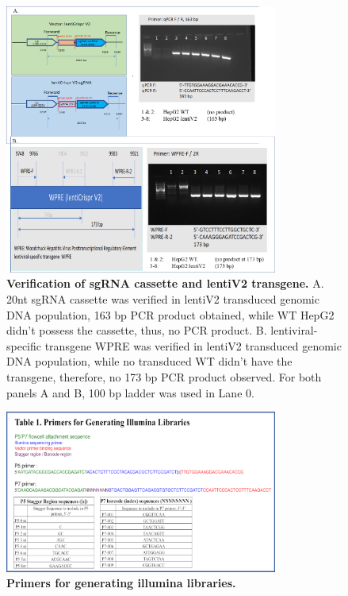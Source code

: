 \documentclass[
  a4paper,
]{article}
\newenvironment{fignos:tagged-figure}[1][]{
  \let\oldfigurename\figurename
  \renewcommand{\figurename}{Supplementary Figure}
}{
  \let\figurename\oldfigurename
}
\begin{document}
\begin{fignos:tagged-figure}[S10]

\begin{figure}
\hypertarget{fig:sup:crispr:fig3}{%
\centering
\includegraphics[width=0.8\textwidth,height=\textheight]{images/crispr/figure3.png}
\caption{\textbf{Verification of sgRNA cassette and lentiV2 transgene.}
A. 20nt sgRNA cassette was verified in lentiV2 transduced genomic DNA population, 163 bp PCR product obtained, while WT HepG2 didn't possess the cassette, thus, no PCR product.
B. lentiviral-specific transgene WPRE was verified in lentiV2 transduced genomic DNA population, while no transduced WT didn't have the transgene, therefore, no 173 bp PCR product observed.
For both panels A and B, 100 bp ladder was used in Lane 0.}\label{fig:sup:crispr:fig3}
}
\end{figure}

\end{fignos:tagged-figure}

\begin{fignos:tagged-figure}[S11]

\begin{figure}
\hypertarget{fig:sup:crispr:table1}{%
\centering
\includegraphics[width=0.8\textwidth,height=\textheight]{images/crispr/table1.png}
\caption{\textbf{Primers for generating illumina libraries.}}\label{fig:sup:crispr:table1}
}
\end{figure}

\end{fignos:tagged-figure}
\end{document}
